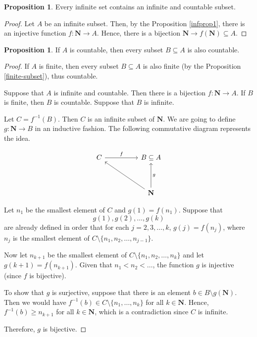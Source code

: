 \documentclass[tikz,12pt,a4paper]{article}
\theoremstyle{definition}
\newtheorem{proposition}[theorem]{Proposition}
\begin{document}
\begin{proposition}\label{propcount1}
	Every infinite set contains an infinite and countable subset.
\end{proposition}

\begin{proof}
	Let $A$ be an infinite subset. Then, by the Proposition \ref{infprop1}, there is an injective function $f : \textbf{N} \longrightarrow A$. Hence, there is a bijection $\textbf{N} \longrightarrow f(\textbf{N}) \subseteq A$.
\end{proof}

\begin{proposition}\label{propcount2}
	If $A$ is countable, then every subset $B \subseteq A$ is also countable.
\end{proposition}

\begin{proof}
	If $A$ is finite, then every subset $B \subseteq A$ is also finite (by the Proposition \ref{finite-subset}), thus countable.
	
	Suppose that $A$ is infinite and countable. Then there is a bijection $f : \textbf{N} \longrightarrow A$. If $B$ is finite, then $B$ is countable. Suppose that $B$ is infinite.
	
	Let $C = f^{-1}(B)$. Then $C$ is an infinite subset of $\textbf{N}$. We are going to define $g : \textbf{N} \longrightarrow B$ in an inductive fashion. The following commutative diagram represents the idea.
	
\[\begin{tikzcd}
	C && {B \subseteq A} \\
	\\
	&& {\textbf{N}}
	\arrow["g"', from=3-3, to=1-3]
	\arrow["f", from=1-1, to=1-3]
	\arrow[from=3-3, to=1-1]
\end{tikzcd}\]

	Let $n_1$ be the smallest element of $C$ and $g(1) = f(n_1)$. Suppose that \[ g(1), g(2), \ldots, g(k) \] are already defined in order that for each $j = 2, 3, \ldots, k$, $g(j) = f(n_j)$, where $n_j$ is the smallest element of $C \setminus \{n_1, n_2, \ldots, n_{j-1} \}$.
	
	Now let $n_{k+1}$ be the smallest element of $C \setminus \{n_1, n_2, \ldots, n_k \}$ and let $g(k+1) = f(n_{k+1})$. Given that $n_1 < n_2 < \ldots$, the function $g$ is injective (since $f$ is bijective).
	
	To show that $g$ is surjective, suppose that there is an element $b \in B \setminus g(\textbf{N})$. Then we would have $f^{-1}(b) \in C \setminus \{ n_1, \ldots, n_k \}$ for all $k \in \textbf{N}$. Hence, $f^{-1}(b) \geq n_{k+1}$ for all $k \in \textbf{N}$, which is a contradiction since $C$ is infinite.
	
	Therefore, $g$ is bijective.
	
\end{proof}
\end{document}
